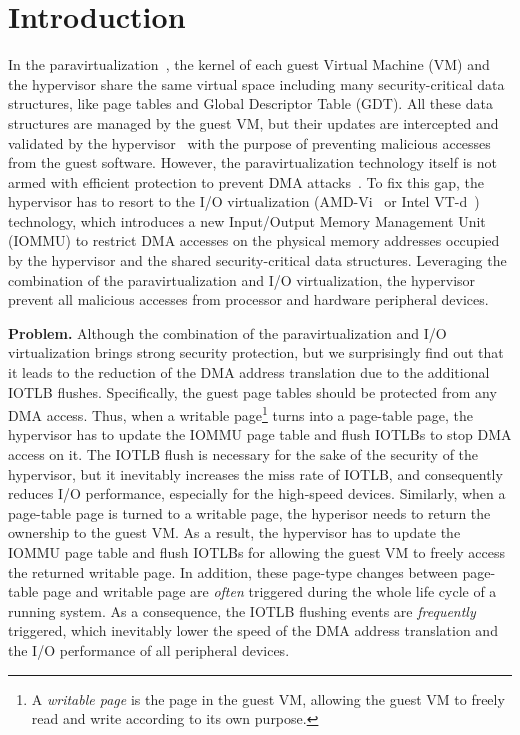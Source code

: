 \section{Introduction} \label{sec:intro}
In the paravirtualization~\cite{XEN-SOSP03,denali-paravirtualization}, the kernel of each guest Virtual Machine (VM) and the hypervisor share the same virtual space including many security-critical data structures, like page tables and Global Descriptor Table (GDT). All these data structures are managed by the guest VM, but their updates are intercepted and validated by the hypervisor~\cite{XEN-SOSP03} with the purpose of preventing malicious accesses from the guest software.
However, the paravirtualization technology itself is not armed with efficient protection to prevent DMA attacks~\cite{disaggregation}.
To fix this gap, the hypervisor has to resort to the I/O virtualization (AMD-Vi~\cite{amdvt} or Intel VT-d~\cite{intelvt}) technology, which introduces a new Input/Output Memory Management Unit (IOMMU) to restrict DMA accesses on the physical memory addresses occupied by the hypervisor and the shared security-critical data structures.
Leveraging the combination of the paravirtualization and I/O virtualization, the hypervisor prevent all malicious accesses from processor and hardware peripheral devices.

\textbf{Problem.} Although the combination of the paravirtualization and I/O virtualization brings strong security protection, but we surprisingly find out that it leads to the reduction of the DMA address translation due to the additional IOTLB flushes.
Specifically, the guest page tables should be protected from any DMA access.
Thus, when a writable page\footnote{A \emph{writable page} is the page in the guest VM, allowing the guest VM to freely read and write according to its own purpose.} turns into a page-table page, the hypervisor has to update the IOMMU page table and flush IOTLBs to stop DMA access on it.
The IOTLB flush is necessary for the sake of the security of the hypervisor, but it inevitably increases the miss rate of IOTLB, and consequently reduces I/O performance, especially for the high-speed devices.
Similarly, when a page-table page is turned to a writable page, the hyperisor needs to return the ownership to the guest VM.
As a result, the hypervisor has to update the IOMMU page table and flush IOTLBs for allowing the guest VM to freely access the returned writable page.
In addition, these page-type changes between page-table page and writable page are \emph{often} triggered during the whole life cycle of a running system.
As a consequence, the IOTLB flushing events are \emph{frequently} triggered, which inevitably lower the speed of the DMA address translation and the I/O performance of all peripheral devices.

